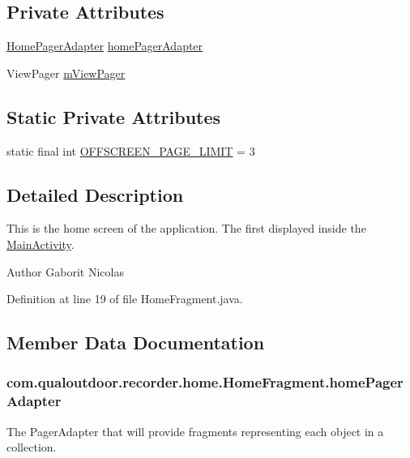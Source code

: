 \subsection*{Private Attributes}
\begin{DoxyCompactItemize}
\item 
\hyperlink{classcom_1_1qualoutdoor_1_1recorder_1_1home_1_1HomePagerAdapter}{Home\-Pager\-Adapter} \hyperlink{classcom_1_1qualoutdoor_1_1recorder_1_1home_1_1HomeFragment_a5778b91724912fb6ef32462b198888ff}{home\-Pager\-Adapter}
\item 
View\-Pager \hyperlink{classcom_1_1qualoutdoor_1_1recorder_1_1home_1_1HomeFragment_a8aab3610e0ef7876cc0998d8d493977e}{m\-View\-Pager}
\end{DoxyCompactItemize}
\subsection*{Static Private Attributes}
\begin{DoxyCompactItemize}
\item 
static final int \hyperlink{classcom_1_1qualoutdoor_1_1recorder_1_1home_1_1HomeFragment_a032167f374f1a63be629e445733d0a8d}{O\-F\-F\-S\-C\-R\-E\-E\-N\-\_\-\-P\-A\-G\-E\-\_\-\-L\-I\-M\-I\-T} = 3
\end{DoxyCompactItemize}


\subsection{Detailed Description}
This is the home screen of the application. The first displayed inside the \hyperlink{classcom_1_1qualoutdoor_1_1recorder_1_1MainActivity}{Main\-Activity}.

\begin{DoxyAuthor}{Author}
Gaborit Nicolas 
\end{DoxyAuthor}


Definition at line 19 of file Home\-Fragment.\-java.



\subsection{Member Data Documentation}
\hypertarget{classcom_1_1qualoutdoor_1_1recorder_1_1home_1_1HomeFragment_a5778b91724912fb6ef32462b198888ff}{
\subsubsection[{home\-Pager\-Adapter}]{ com.\-qualoutdoor.\-recorder.\-home.\-Home\-Fragment.\-home\-Pager\-Adapter\hspace{0.3cm}{\ttfamily [private]}}}\label{classcom_1_1qualoutdoor_1_1recorder_1_1home_1_1HomeFragment_a5778b91724912fb6ef32462b198888ff}
The Pager\-Adapter that will provide fragments representing each object in a collection. 


